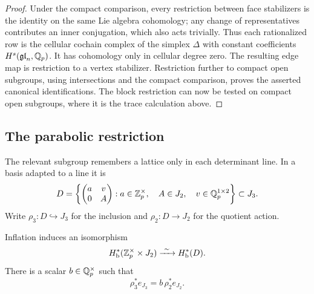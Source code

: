\begin{proof}
Under the compact comparison, every restriction between face
stabilizers is the identity on the same Lie algebra cohomology;
any change of representatives contributes an inner conjugation,
which also acts trivially.  Thus each rationalized row is the
cellular cochain complex of the simplex $\Delta$ with constant
coefficients $H^s(\mathfrak{gl}_n,\mathbb Q_p)$.
It has cohomology only in cellular degree zero.
The resulting edge map is restriction to a vertex stabilizer.
Restriction further to compact open subgroups, using intersections
and the compact comparison, proves the asserted canonical
identifications.  The block restriction can now be tested on
compact open subgroups, where it is the trace calculation above.
\end{proof}

\subsection{The parabolic restriction}

The relevant subgroup remembers a lattice only in each determinant
line.  In a basis adapted to a line it is
\[
 D=\left\{
 \begin{pmatrix}a&v\\0&A\end{pmatrix}:
 a\in\mathbb Z_p^\times,\quad A\in J_2,\quad
 v\in\mathbb Q_p^{1\times2}\right\}\subset J_3.
\]
Write $\rho_3:D\hookrightarrow J_3$ for the inclusion and
$\rho_2:D\to J_2$ for the quotient action.

\begin{lemma}
\label{lem:parabolic}
Inflation induces an isomorphism
\[
 H^*_{\mathrm b}(\mathbb Z_p^\times\times J_2)
       \xrightarrow{\ \sim\ }H^*_{\mathrm b}(D).
\]
There is a scalar $b\in\mathbb Q_p^\times$ such that
\[
 \rho_3^*e_{J_3}=b\,\rho_2^*e_{J_2}.
\]
\end{lemma}

